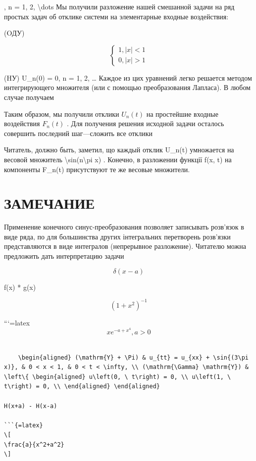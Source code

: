 \documentclass[
]{article}
\begin{document}
, n = 1, 2, \textbackslash dots Мы получили разложение нашей смешанной
задачи на ряд простых задач об отклике системи на элементарные входные
воздействия:

(OДУ)

\[
\begin{cases} 1, |x| < 1 \\ 0, |x| > 1 \end{cases}
\]

(HУ) U\_n(0) = 0, n = 1, 2, \ldots{} Каждое из цих уравнений легко
решается методом интегрирующего множителя (или с помощью преобразования
Лапласа). В любом случае получаем

Таким образом, мы получили отклики \(U_n(t)\) на простейшие входные
воздействия \(F_n(t)\) . Для получения решения исходной задачи осталось
совершить последний шаг---сложить все отклики

Читатель, должно быть, заметил, що каждый отклик U\_n(t) умножается на
весовой множитель \textbackslash sin(n\textbackslash pi x) . Конечно, в
разложении функції f(x, t) на компоненты F\_n(t) присутствуют те же
весовые множители.

\section{ЗАМЕЧАНИЕ}\label{ux437ux430ux43cux435ux447ux430ux43dux438ux435-1}

Применение конечного синус-преобразования позволяет записывать розв'язок
в виде ряда, по для большинства других інтегральних перетворень
розв'язки представляются в виде интегралов (непрерывное разложение).
Читателю можна предложить дать интерпретацию задачи

\[
\delta(x-a)
\]

f(x) * g(x)

\[
(1+x^2)^{-1}
\]

```{=latex}
\[
xe^{-a+x^4}, a > 0
\]

\begin{verbatim}

    \begin{aligned} (\mathrm{Y} + \Pi) & u_{tt} = u_{xx} + \sin{(3\pi x)}, & 0 < x < 1, & 0 < t < \infty, \\ (\mathrm{\Gamma} \mathrm{Y}) & \left\{ \begin{aligned} u\left(0, \ t\right) = 0, \\ u\left(1, \ t\right) = 0, \\ \end{aligned} \end{aligned}

H(x+a) - H(x-a)

```{=latex}
\[
\frac{a}{x^2+a^2}
\]
\end{verbatim}
\end{document}
